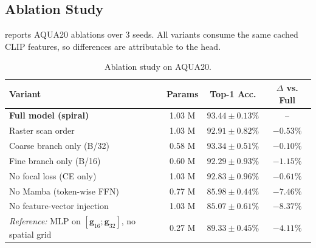 \documentclass[runningheads]{llncs}
\begin{document}





\subsection{Ablation Study}
\label{sec:ablation}
 reports AQUA20 ablations over 3 seeds. All variants consume the same cached CLIP features, so differences are attributable to the head.

\begin{table}[!htbp]
\centering
\caption{Ablation study on AQUA20.}
\label{tab:ablation}
\begin{tabular}{lccc}
\toprule
Variant & Params & Top-1 Acc. & $\Delta$ vs. Full \\
\midrule
\textbf{Full model (spiral)}         & 1.03 M & $\mathbf{93.44\pm0.13\%}$ & -- \\
Raster scan order                    & 1.03 M & $92.91\pm0.82\%$          & $-0.53\%$ \\
Coarse branch only (B/32)            & 0.58 M & $93.34\pm0.51\%$          & $-0.10\%$ \\
Fine branch only (B/16)              & 0.60 M & $92.29\pm0.93\%$          & $-1.15\%$ \\
No focal loss (CE only)              & 1.03 M & $92.83\pm0.96\%$          & $-0.61\%$ \\
No Mamba (token-wise FFN)            & 0.77 M & $85.98\pm0.44\%$          & $-7.46\%$ \\
No feature-vector injection          & 1.03 M & $85.07\pm0.61\%$          & $-8.37\%$ \\
\midrule
\emph{Reference:} MLP on $[\mathbf{g}_{16};\mathbf{g}_{32}]$, no spatial grid & 0.27 M & $89.33\pm0.45\%$ & $-4.11\%$ \\
\bottomrule
\end{tabular}
\end{table}
\FloatBarrier
\end{document}
